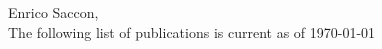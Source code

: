 \documentclass[10pt,a4paper,sans]{article}
\begin{document}
\pagestyle{empty}

\begin{center}
  \Large{Enrico Saccon,}\\
  \Large{The following list of publications is current as of \today}
\end{center}

\nocite{*}
\printbibliography[heading=none]
\end{document}
